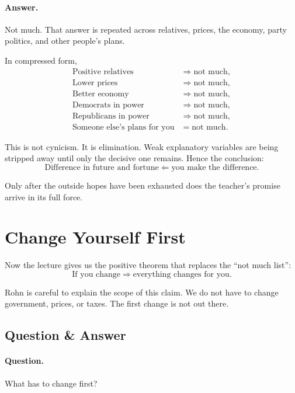 \paragraph{Answer.} Not much. That answer is repeated across relatives, prices, the economy, party politics, and other people's plans.

In compressed form,
\begin{align}
\text{Positive relatives} &\Longrightarrow \text{not much},\\
\text{Lower prices} &\Longrightarrow \text{not much},\\
\text{Better economy} &\Longrightarrow \text{not much},\\
\text{Democrats in power} &\Longrightarrow \text{not much},\\
\text{Republicans in power} &\Longrightarrow \text{not much},\\
\text{Someone else's plans for you} &= \text{not much}.
\end{align}

This is not cynicism. It is elimination. Weak explanatory variables are being stripped away until only the decisive one remains. Hence the conclusion:
\begin{equation}
\text{Difference in future and fortune} \Longleftarrow \text{you make the difference}.
\end{equation}

Only after the outside hopes have been exhausted does the teacher's promise arrive in its full force.

\section{Change Yourself First}

Now the lecture gives us the positive theorem that replaces the ``not much list'':
\begin{equation}
\text{If you change} \Longrightarrow \text{everything changes for you}.
\end{equation}

Rohn is careful to explain the scope of this claim. We do not have to change government, prices, or taxes. The first change is not out there.

\subsection{Question \& Answer}

\paragraph{Question.} What has to change first?

